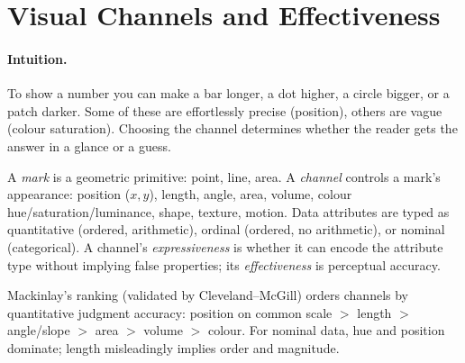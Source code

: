 \section{Visual Channels and Effectiveness}
\label{sec:channels}
\paragraph{Intuition.} To show a number you can make a bar longer, a dot higher, a circle bigger, or a patch darker. Some of these are effortlessly precise (position), others are vague (colour saturation). Choosing the channel determines whether the reader gets the answer in a glance or a guess.

\begin{definition}\label{def:channels}
A \emph{mark} is a geometric primitive: point, line, area. A \emph{channel} controls a mark's appearance: position ($x,y$), length, angle, area, volume, colour hue/saturation/luminance, shape, texture, motion. Data attributes are typed as quantitative (ordered, arithmetic), ordinal (ordered, no arithmetic), or nominal (categorical). A channel's \emph{expressiveness} is whether it can encode the attribute type without implying false properties; its \emph{effectiveness} is perceptual accuracy.
\end{definition}

Mackinlay's ranking (validated by Cleveland--McGill) orders channels by quantitative judgment accuracy: position on common scale $>$ length $>$ angle/slope $>$ area $>$ volume $>$ colour. For nominal data, hue and position dominate; length misleadingly implies order and magnitude.


